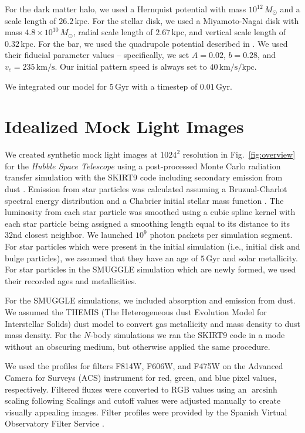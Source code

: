 \documentclass[twocolumn,linenumbers]{aastex631}
\newcommand{\kms}{\ensuremath{\textrm{km}/\textrm{s}}}
\newcommand{\Nbody}{$N$-body}
\newcommand{\SMUGGLE}{SMUGGLE}
\newcommand{\Msun}{\ensuremath{M_{\odot}}}
\DeclareMathOperator\arcsinh{arcsinh}
\begin{document}
For the dark matter halo, we used a Hernquist potential
\citep{1990ApJ...356..359H} with mass $10^{12}\,\Msun$ and a scale length of
$26.2\,\textrm{kpc}$. For the stellar disk, we used a Miyamoto-Nagai disk
\citep{1975PASJ...27..533M} with mass $4.8\times10^{10}\,\Msun$, radial scale
length of $2.67\,\textrm{kpc}$, and vertical scale length of
$0.32\,\textrm{kpc}$. For the bar, we used the quadrupole potential described in
\citet{2022MNRAS.513..768C}. We used their fiducial parameter values --
specifically, we set $A=0.02$, $b=0.28$, and $v_c = 235\,\kms$. Our initial
pattern speed is always set to $40\,\kms/\textrm{kpc}$.

We integrated our model for $5\,\textrm{Gyr}$ with a timestep of
$0.01\,\textrm{Gyr}$.

\section{Idealized Mock Light Images}
\label{app:hst}
We created synthetic mock light images at $1024^2$ resolution in
Fig.~\ref{fig:overview} for the \textit{Hubble Space Telescope} using a
post-processed Monte Carlo radiation transfer simulation with the SKIRT9 code
including secondary emission from dust \citep{2020AC....3100381C}. Emission from
star particles was calculated assuming a Bruzual-Charlot spectral energy
distribution \citep{2003MNRAS.344.1000B} and a Chabrier initial stellar mass
function \citep{2003PASP..115..763C}. The luminosity from each star particle was
smoothed using a cubic spline kernel with each star particle being assigned a
smoothing length equal to its distance to its $32$nd closest neighbor. We
launched $10^9$ photon packets per simulation segment. For star particles
which were present in the initial simulation (i.e., initial disk and bulge
particles), we assumed that they have an age of $5\,\textrm{Gyr}$ and solar
metallicity. For star particles in the \SMUGGLE{} simulation which are newly
formed, we used their recorded ages and metallicities.

For the \SMUGGLE{} simulations, we included absorption and emission from dust. We
assumed the THEMIS (The Heterogeneous dust Evolution Model for Interstellar
Solids) dust model \citep{2017AA...602A..46J} to convert gas metallicity and
mass density to dust mass density. For the \Nbody{} simulations we ran the
SKIRT9 code in a mode without an obscuring medium, but otherwise applied the
same procedure.

We used the profiles for filters F814W, F606W, and F475W on the Advanced
Camera for Surveys (ACS) instrument for red, green, and blue pixel values,
respectively. Filtered fluxes were converted to RGB values using an $\arcsinh$
scaling following \citet{2004PASP..116..133L} Scalings and cutoff values
were adjusted manually to create visually appealing images. Filter profiles
were provided by the Spanish Virtual Observatory Filter
Service \citep{2012ivoa.rept.1015R, 2020sea..confE.182R}.
\end{document}
